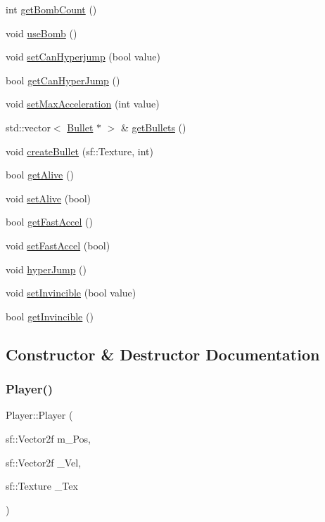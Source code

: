 \begin{DoxyCompactItemize}
int \hyperlink{class_player_a83204202817d4d34694a515c85ae3f0d}{get\+Bomb\+Count} ()
\item 
void \hyperlink{class_player_a1b9e6a1aebb4805e14bdefbb1566fb6d}{use\+Bomb} ()
\item 
void \hyperlink{class_player_ad3994801b0ca5d5da392302bbb56e0e8}{set\+Can\+Hyperjump} (bool value)
\item 
bool \hyperlink{class_player_a6f6ceb55f695ffd573d1e4b999896893}{get\+Can\+Hyper\+Jump} ()
\item 
void \hyperlink{class_player_a0a644b2b50d659f6bd21dadefd6c5f14}{set\+Max\+Acceleration} (int value)
\item 
std\+::vector$<$ \hyperlink{class_bullet}{Bullet} $\ast$ $>$ \& \hyperlink{class_player_a4ad45c4c8298531f45ebed48ce001373}{get\+Bullets} ()
\item 
void \hyperlink{class_player_a9d1ab7c1d5ac909e9fc85ca7ed844985}{create\+Bullet} (sf\+::\+Texture, int)
\item 
bool \hyperlink{class_player_aa45f751e7ba8afcd9894d57ef4813d50}{get\+Alive} ()
\item 
void \hyperlink{class_player_a6a05faf900b692306c66caa43b7ffb4f}{set\+Alive} (bool)
\item 
bool \hyperlink{class_player_a8ee193bc4d7773b6a1114e1b312f7eac}{get\+Fast\+Accel} ()
\item 
void \hyperlink{class_player_ac35450b46e8c7555d8098002898a6daa}{set\+Fast\+Accel} (bool)
\item 
void \hyperlink{class_player_a012354ce1dfa33d6393c41afc4db0e6c}{hyper\+Jump} ()
\item 
void \hyperlink{class_player_a796610d4bf49196f261a82f5b2c0a044}{set\+Invincible} (bool value)
\item 
bool \hyperlink{class_player_a35c75510e8be559cb1f9272bfc11d026}{get\+Invincible} ()
\end{DoxyCompactItemize}


\subsection{Constructor \& Destructor Documentation}
\mbox{\label{class_player_a50b4f692a8315358192c8d955cf1250d}} 
\subsubsection{\texorpdfstring{Player()}{Player()}}
{\footnotesize\ttfamily Player\+::\+Player (\begin{DoxyParamCaption}\item[{sf\+::\+Vector2f}]{m\+\_\+\+Pos,  }\item[{sf\+::\+Vector2f}]{\+\_\+\+Vel,  }\item[{sf\+::\+Texture}]{\+\_\+\+Tex }\end{DoxyParamCaption})}

